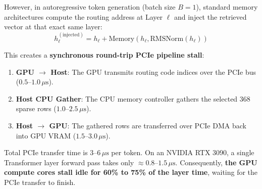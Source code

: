 \documentclass[11pt,a4paper]{article}
\begin{document}
However, in autoregressive token generation (batch size $B=1$), standard memory architectures compute the routing address at Layer $\ell$ and inject the retrieved vector at that exact same layer:
\begin{equation}
h_\ell^{(\text{injected})} = h_\ell + \text{Memory}(h_\ell, \text{RMSNorm}(h_\ell))
\end{equation}

This creates a \textbf{synchronous round-trip PCIe pipeline stall}:
\begin{enumerate}[leftmargin=1.4em, itemsep=2pt]
    \item \textbf{GPU $\to$ Host}: The GPU transmits routing code indices over the PCIe bus ($0.5\text{--}1.0\,\mu\text{s}$).
    \item \textbf{Host CPU Gather}: The CPU memory controller gathers the selected 368 sparse rows ($1.0\text{--}2.5\,\mu\text{s}$).
    \item \textbf{Host $\to$ GPU}: The gathered rows are transferred over PCIe DMA back into GPU VRAM ($1.5\text{--}3.0\,\mu\text{s}$).
\end{enumerate}
Total PCIe transfer time is $3\text{--}6\,\mu\text{s}$ per token. On an NVIDIA RTX 3090, a single Transformer layer forward pass takes only $\approx 0.8\text{--}1.5\,\mu\text{s}$. Consequently, \textbf{the GPU compute cores stall idle for 60\% to 75\% of the layer time}, waiting for the PCIe transfer to finish.
\end{document}
